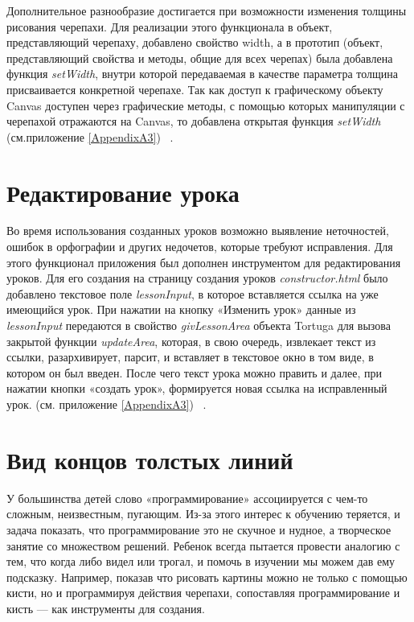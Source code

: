 Дополнительное разнообразие достигается при возможности изменения толщины рисования черепахи. Для реализации этого функционала в объект, представляющий черепаху, добавлено свойство width, а в прототип (объект, представляющий свойства и методы, общие для всех черепах) была добавлена функция \textit{setWidth}, внутри которой передаваемая в качестве параметра толщина присваивается конкретной черепахе. Так как доступ к графическому объекту Canvas доступен через графические методы, с помощью которых манипуляции с черепахой отражаются на Canvas, то добавлена открытая функция \textit{setWidth} (см.приложение \ref{AppendixA3}) ~\cite{prototype}.

\section{Редактирование урока} \label{sect1_1}

Во время использования созданных уроков возможно выявление  неточностей, ошибок в орфографии и других недочетов, которые требуют исправления. Для этого функционал приложения был дополнен инструментом для редактирования уроков. Для его создания на страницу создания уроков \textit{constructor.html} было добавлено текстовое поле \textit{lessonInput}, в которое вставляется ссылка на уже имеющийся урок. При нажатии на кнопку «Изменить урок» данные из \textit{lessonInput} передаются в свойство \textit{givLessonArea} объекта Tortuga для вызова закрытой функции \textit{updateArea}, которая, в свою очередь,  извлекает текст из ссылки, разархивирует, парсит, и вставляет в текстовое окно в том виде, в котором он был введен. После чего текст урока можно править и далее, при нажатии кнопки «создать урок», формируется новая ссылка на исправленный урок. (см. приложение \ref{AppendixA3}) ~\cite{elementsdom, string}.


\section{Вид концов толстых линий} \label{sect1_1}
У большинства детей  слово «программирование» ассоциируется с чем-то сложным, неизвестным, пугающим. Из-за этого интерес к обучению теряется, и задача показать, что программирование это не скучное и нудное, а творческое занятие со множеством решений. Ребенок всегда пытается провести аналогию с тем, что когда либо видел или трогал, и помочь в изучении мы можем дав ему подсказку. Например, показав что рисовать картины можно не только с помощью  кисти, но и программируя действия черепахи, сопоставляя программирование и  кисть --- как инструменты для создания.

